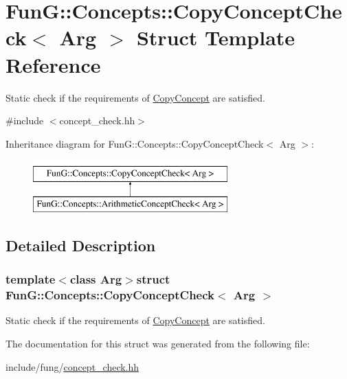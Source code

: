 \hypertarget{structFunG_1_1Concepts_1_1CopyConceptCheck}{\section{Fun\-G\-:\-:Concepts\-:\-:Copy\-Concept\-Check$<$ Arg $>$ Struct Template Reference}
\label{structFunG_1_1Concepts_1_1CopyConceptCheck}
}


Static check if the requirements of \hyperlink{structFunG_1_1Concepts_1_1CopyConcept}{Copy\-Concept} are satisfied.  




{\ttfamily \#include $<$concept\-\_\-check.\-hh$>$}

Inheritance diagram for Fun\-G\-:\-:Concepts\-:\-:Copy\-Concept\-Check$<$ Arg $>$\-:\begin{figure}[H]
\begin{center}
\leavevmode
\includegraphics[height=2.000000cm]{structFunG_1_1Concepts_1_1CopyConceptCheck}
\end{center}
\end{figure}


\subsection{Detailed Description}
\subsubsection*{template$<$class Arg$>$struct Fun\-G\-::\-Concepts\-::\-Copy\-Concept\-Check$<$ Arg $>$}

Static check if the requirements of \hyperlink{structFunG_1_1Concepts_1_1CopyConcept}{Copy\-Concept} are satisfied. 

The documentation for this struct was generated from the following file\-:\begin{DoxyCompactItemize}
\item 
include/fung/\hyperlink{concept__check_8hh}{concept\-\_\-check.\-hh}\end{DoxyCompactItemize}
